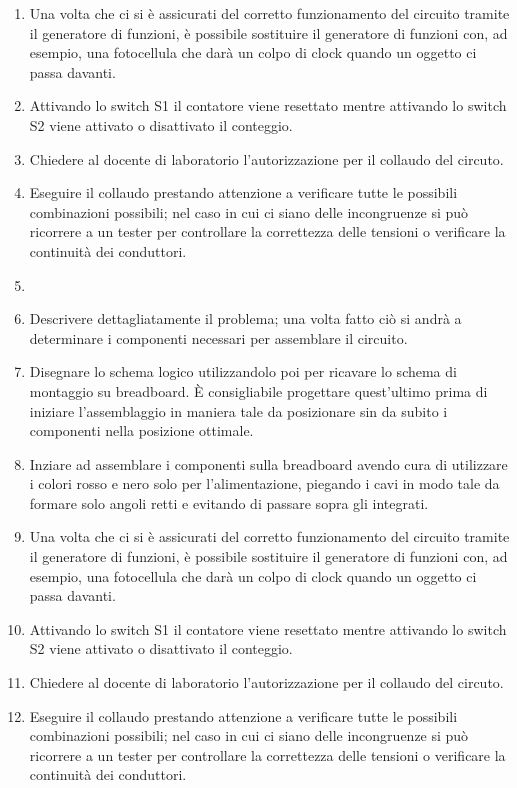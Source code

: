 \documentclass[a4paper, 10pt]{RelazioneLab}
\begin{document}
\begin{enumerate}
        \item Una volta che ci si è assicurati del corretto funzionamento del circuito tramite il generatore di funzioni, è possibile sostituire il generatore di funzioni con, ad esempio, una fotocellula che darà un colpo di clock quando un oggetto ci passa davanti.
        \item Attivando lo switch S1 il contatore viene resettato mentre attivando lo switch S2 viene attivato o disattivato il conteggio. 
        \item Chiedere al docente di laboratorio l'autorizzazione per il collaudo del circuto.
        \item Eseguire il collaudo prestando attenzione a verificare tutte le possibili combinazioni possibili; nel caso in cui ci siano delle incongruenze si può ricorrere a un tester per controllare la correttezza delle tensioni o verificare la continuità dei conduttori.
        \item \item Descrivere dettagliatamente il problema; una volta fatto ciò si andrà a determinare i componenti necessari per assemblare il circuito.
        \item Disegnare lo schema logico utilizzandolo poi per ricavare lo schema di montaggio su breadboard. È consigliabile progettare quest'ultimo prima di iniziare l'assemblaggio in maniera tale da posizionare sin da subito i componenti nella posizione ottimale.
        \item Inziare ad assemblare i componenti sulla breadboard avendo cura di utilizzare i colori rosso e nero solo per l'alimentazione, piegando i cavi in modo tale da formare solo angoli retti e evitando di passare sopra gli integrati. 
        \item Una volta che ci si è assicurati del corretto funzionamento del circuito tramite il generatore di funzioni, è possibile sostituire il generatore di funzioni con, ad esempio, una fotocellula che darà un colpo di clock quando un oggetto ci passa davanti.
        \item Attivando lo switch S1 il contatore viene resettato mentre attivando lo switch S2 viene attivato o disattivato il conteggio. 
        \item Chiedere al docente di laboratorio l'autorizzazione per il collaudo del circuto.
        \item Eseguire il collaudo prestando attenzione a verificare tutte le possibili combinazioni possibili; nel caso in cui ci siano delle incongruenze si può ricorrere a un tester per controllare la correttezza delle tensioni o verificare la continuità dei conduttori.
    \end{enumerate}
\end{document}

